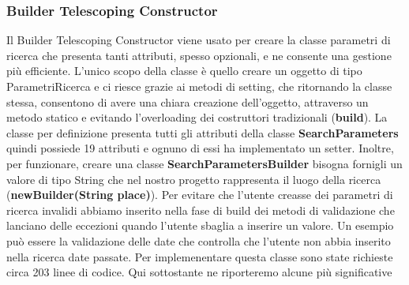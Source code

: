 \documentclass[10pt]{article}
\begin{document}
\subsubsection{Builder Telescoping Constructor}

Il Builder Telescoping Constructor viene usato per creare la classe parametri di ricerca che presenta tanti attributi, spesso opzionali, e ne consente una gestione più efficiente. L'unico scopo della classe è quello creare un oggetto di tipo ParametriRicerca e ci riesce grazie ai metodi di setting, che ritornando la classe stessa, consentono di avere una chiara creazione dell'oggetto, attraverso un metodo statico e evitando l'overloading dei costruttori tradizionali (\textbf{build}). La classe per definizione presenta tutti gli attributi della classe \textbf{SearchParameters} quindi possiede 19 attributi e ognuno di essi ha implementato un setter. Inoltre, per funzionare, creare una classe \textbf{SearchParametersBuilder} bisogna fornigli un valore di tipo String che nel nostro progetto rappresenta il luogo della ricerca (\textbf{newBuilder(String place)}). Per evitare che l'utente creasse dei parametri di ricerca invalidi abbiamo inserito nella fase di build dei metodi di validazione che lanciano delle eccezioni quando l'utente sbaglia a inserire un valore. Un esempio può essere la validazione delle date che controlla che l'utente non abbia inserito nella ricerca date passate.
Per implemenentare questa classe sono state richieste circa 203 linee di codice. Qui sottostante ne riporteremo alcune più significative
\par\medskip
\end{document}
